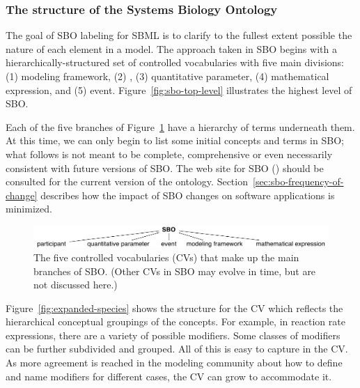 \subsubsection{The structure of the Systems Biology Ontology}

The goal of SBO labeling for SBML is to clarify to the fullest
extent possible the nature of each element in a model.  The
approach taken in SBO begins with a hierarchically-structured set
of controlled vocabularies with five main divisions: (1) modeling
framework, (2) , (3) quantitative parameter, (4)
mathematical expression, and (5) event.
Figure~\vref{fig:sbo-top-level} illustrates the highest level of
SBO.

Each of the five branches of Figure~\ref{fig:sbo-top-level} have a
hierarchy of terms underneath them.  At this time, we can only
begin to list some initial concepts and terms in SBO; what follows
is not meant to be complete, comprehensive or even necessarily
consistent with future versions of SBO.  The web site for SBO
(\sboref) should be consulted for the current version of the
ontology.  Section~\ref{sec:sbo-frequency-of-change} describes how
the impact of SBO changes on software applications is minimized.

\begin{figure}[tbh]
  \vspace*{1ex}
  \centering
  \includegraphics[scale = 0.8]{figs/sbo-top-level}
  \vspace*{1ex}
  \caption{The five controlled vocabularies (CVs) that
      make up the main branches of SBO.  (Other CVs in SBO may
      evolve in time, but are not discussed here.)}
  \label{fig:sbo-top-level}
\end{figure}

Figure~\vref{fig:expanded-species} shows the structure
for the \emph{} CV which reflects the hierarchical
conceptual groupings of the concepts. For example, in reaction
rate expressions, there are a variety of possible modifiers.  Some
classes of modifiers can be further subdivided and grouped.  All
of this is easy to capture in the CV.  As more agreement is
reached in the modeling community about how to define and name
modifiers for different cases, the CV can grow to accommodate it.

